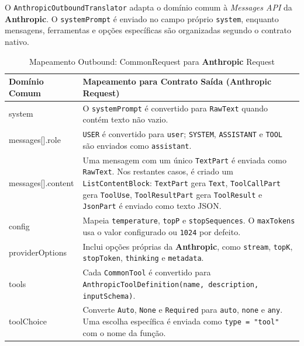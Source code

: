     O \texttt{AnthropicOutboundTranslator} adapta o domínio comum à \textit{Messages API} da \textbf{Anthropic}. O \texttt{systemPrompt} é enviado no campo próprio \texttt{system}, enquanto mensagens, ferramentas e opções específicas são organizadas segundo o contrato nativo.

    \begin{table}[H]
        \centering
        \footnotesize
        \renewcommand{\arraystretch}{1.25}
        \begin{tabularx}{\textwidth}{|>{\ttfamily\raggedright\arraybackslash}p{4cm}|Y|}
            \hline
            \textbf{Domínio Comum} & \textbf{Mapeamento para Contrato Saída (Anthropic Request)} \\
            \hline
            system & O \texttt{systemPrompt} é convertido para \texttt{RawText} quando contém texto não vazio. \\
            \hline
            messages[].role & \texttt{USER} é convertido para \texttt{user}; \texttt{SYSTEM}, \texttt{ASSISTANT} e \texttt{TOOL} são enviados como \texttt{assistant}. \\
            \hline
            messages[].content & Uma mensagem com um único \texttt{TextPart} é enviada como \texttt{RawText}. Nos restantes casos, é criado um \texttt{ListContentBlock}: \texttt{TextPart} gera \texttt{Text}, \texttt{ToolCallPart} gera \texttt{ToolUse}, \texttt{ToolResultPart} gera \texttt{ToolResult} e \texttt{JsonPart} é enviado como texto JSON. \\
            \hline
            config & Mapeia \texttt{temperature}, \texttt{topP} e \texttt{stopSequences}. O \texttt{maxTokens} usa o valor configurado ou \texttt{1024} por defeito. \\
            \hline
            providerOptions & Inclui opções próprias da \textbf{Anthropic}, como \texttt{stream}, \texttt{topK}, \texttt{stopToken}, \texttt{thinking} e \texttt{metadata}. \\
            \hline
            tools & Cada \texttt{CommonTool} é convertido para \texttt{AnthropicToolDefinition(name, description, inputSchema)}. \\
            \hline
            toolChoice & Converte \texttt{Auto}, \texttt{None} e \texttt{Required} para \texttt{auto}, \texttt{none} e \texttt{any}. Uma escolha específica é enviada como \texttt{type = "tool"} com o nome da função. \\
            \hline
        \end{tabularx}
        \caption{Mapeamento Outbound: CommonRequest para \textbf{Anthropic} Request}
    \end{table}


